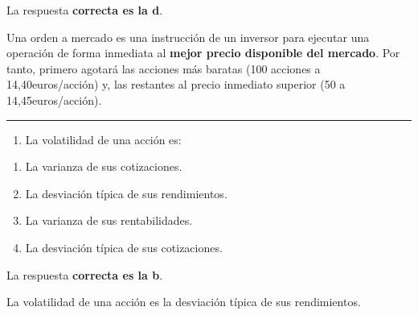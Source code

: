 \documentclass[
  letterpaper,
  DIV=11,
  numbers=noendperiod]{scrreprt}
\providecommand{\tightlist}{%
  \setlength{\itemsep}{0pt}\setlength{\parskip}{0pt}}\usepackage{longtable,booktabs,array}
\begin{document}
\begin{tcolorbox}[enhanced jigsaw, left=2mm, opacityback=0, colback=white, breakable, arc=.35mm, bottomrule=.15mm, rightrule=.15mm, toprule=.15mm, leftrule=.75mm, colframe=quarto-callout-tip-color-frame]
\begin{minipage}[t]{5.5mm}
\textcolor{quarto-callout-tip-color}{\faLightbulb}
\end{minipage}%
\begin{minipage}[t]{\textwidth - 5.5mm}

La respuesta \textbf{correcta es la d}.

Una orden a mercado es una instrucción de un inversor para ejecutar una
operación de forma inmediata al \textbf{mejor precio disponible del
mercado}. Por tanto, primero agotará las acciones más baratas (100
acciones a 14,40euros/acción) y, las restantes al precio inmediato
superior (50 a 14,45euros/acción).

\end{minipage}%
\end{tcolorbox}

\begin{center}\rule{0.5\linewidth}{0.5pt}\end{center}

\begin{enumerate}
\def\labelenumi{\arabic{enumi}.}
\setcounter{enumi}{29}
\tightlist
\item
  La volatilidad de una acción es:
\end{enumerate}

\begin{enumerate}
\def\labelenumi{\alph{enumi})}
\item
  La varianza de sus cotizaciones.
\item
  La desviación típica de sus rendimientos.
\item
  La varianza de sus rentabilidades.
\item
  La desviación típica de sus cotizaciones.
\end{enumerate}

\begin{tcolorbox}[enhanced jigsaw, left=2mm, opacityback=0, colback=white, breakable, arc=.35mm, bottomrule=.15mm, rightrule=.15mm, toprule=.15mm, leftrule=.75mm, colframe=quarto-callout-tip-color-frame]
\begin{minipage}[t]{5.5mm}
\textcolor{quarto-callout-tip-color}{\faLightbulb}
\end{minipage}%
\begin{minipage}[t]{\textwidth - 5.5mm}

La respuesta \textbf{correcta es la b}.

La volatilidad de una acción es la desviación típica de sus
rendimientos.

\end{minipage}%
\end{tcolorbox}
\end{document}
